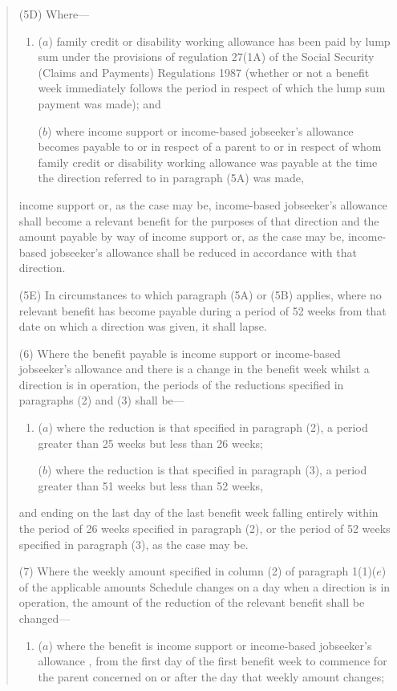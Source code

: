 \documentclass[a4paper,12pt]{article}
\begin{document}
{\begin{quotation}
(5D) Where—
\begin{enumerate}\item[]
($a$) family credit or disability working allowance has been paid by lump sum under the provisions of regulation 27(1A) of the Social Security (Claims and Payments) Regulations 1987 (whether or not a benefit week immediately follows the period in respect of which the lump sum payment was made); and

($b$) where income support 
or income-based jobseeker’s allowance  %
becomes payable to or in respect of a parent to or in respect of whom family credit or disability working allowance was payable at the time the direction referred to in paragraph (5A) was made, 
\end{enumerate}
income support 
or, as the case may be, income-based jobseeker’s allowance  %
shall become a relevant benefit for the purposes of that direction and the amount payable by way of income support 
or, as the case may be, income-based jobseeker’s allowance  %
shall be reduced in accordance with that direction.

(5E) In circumstances to which paragraph (5A) or (5B) applies, where no relevant benefit has become payable during a period of 52 weeks from that date on which a direction was given, it shall lapse.

(6) Where the benefit payable is income support 
or income-based jobseeker’s allowance  %
and there is a change in the benefit week whilst a direction is in operation, the periods of the reductions specified in paragraphs (2) and (3) shall be—
\begin{enumerate}\item[]
($a$) where the reduction is that specified in paragraph (2), a period greater than 25 weeks but less than 26 weeks;

($b$) where the reduction is that specified in paragraph (3), a period greater than 51 weeks but less than 52 weeks,
\end{enumerate}
and ending on the last day of the last benefit week falling entirely within the period of 26 weeks specified in paragraph (2), or the period of 52 weeks specified in paragraph (3), as the case may be.

(7) Where the weekly amount specified in column (2) of paragraph 1(1)($e$) of the applicable amounts Schedule changes on a day when a direction is in operation, the amount of the reduction of the relevant benefit shall be changed—
\begin{enumerate}\item[]
($a$) where the benefit is income support
or income-based jobseeker’s allowance%
, from the first day of the first benefit week to commence for the parent concerned on or after the day that weekly amount changes;


\end{enumerate}
\end{quotation}}
\end{document}
